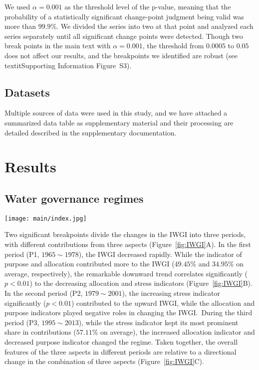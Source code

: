 \documentclass[draft]{../agujournal2019}
\begin{document}
We used $\alpha = 0.001$ as the threshold level of the p-value, meaning that the probability of a statistically significant change-point judgment being valid was more than $99.9\%$. We divided the series into two at that point and analyzed each series separately until all significant change points were detected. Though two break points in the main text with $\alpha = 0.001$, the threshold from $0.0005$ to $0.05$ does not affect our results, and the breakpoints we identified are robust (see \\textit{Supporting Information} Figure~S3).

	\subsection{Datasets}
Multiple sources of data were used in this study, and we have attached a summarized data table as supplementary material and their processing are detailed described in the supplementary documentation.
 \section{Results}\label{sec2}
\subsection{Water governance regimes}\label{Res.1}

\begin{figure*}[ht!]
	\centering
	\texttt{[image: main/index.jpg]}
	\caption{Changes in the IWGI index and corresponding water governance regimes: P1: $1965 \sim 1978$, P2: $1979 \sim 2001$, and P3: $2002 \sim 2013$.
	\textbf{A,} detecting change points of IWGI and contributions from each indicator. Two significant change points ($p<0.001$) occurred in 1978 and 2001.
	\textbf{B,} correlation of trends between the IWGI and the indicators.
	\textbf{C,} across three indicators, changing components of the IWGI, whose directions shifts between different regimes.
	}\label{fig:IWGI}
\end{figure*}

Two significant breakpoints divide the changes in the IWGI into three periods, with different contributions from three aspects (Figure~\ref{fig:IWGI}A).
In the first period (P1, $1965 \sim 1978$), the IWGI decreased rapidly.
While the indicator of purpose and allocation contributed more to the IWGI ($49.45\%$ and $34.95\%$ on average, respectively), the remarkable downward trend correlates significantly ($p<0.01$) to the decreasing allocation and stress indicators (Figure~\ref{fig:IWGI}B).
In the second period (P2, $1979 \sim 2001$), the increasing stress indicator significantly ($p<0.01$) contributed to the upward IWGI, while the allocation and purpose indicators played negative roles in changing the IWGI.\
During the third period (P3, $1995 \sim 2013$), while the stress indicator kept its most prominent share in contributions ($57.11\%$ on average), the increased allocation indicator and decreased purpose indicator changed the regime.
Taken together, the overall features of the three aspects in different periods are relative to a directional change in the combination of three aspects (Figure~\ref{fig:IWGI}C).
\end{document}
